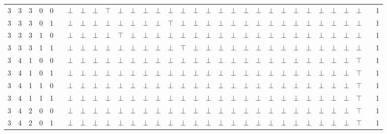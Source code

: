 \documentclass[12pt]{extarticle}
\begin{document}
\begin{landscape}
\begin{tiny}
\begin{longtable}[c]{llllllllllllllllllllllllllllllll}
3 & 3 & 3 & 0 & 0 &  & $\bot$ & $\bot$ & $\bot$ & $\top$ & $\bot$ & $\bot$ & $\bot$ & $\bot$ & $\bot$ & $\bot$ & $\bot$ & $\bot$ & $\bot$ & $\bot$ & $\bot$ & $\bot$ & $\bot$ & $\bot$ & $\bot$ & $\bot$ & $\bot$ & $\bot$ & $\bot$ & $\bot$ &  & 1 \\
3 & 3 & 3 & 0 & 1 &  & $\bot$ & $\bot$ & $\bot$ & $\bot$ & $\bot$ & $\bot$ & $\bot$ & $\bot$ & $\top$ & $\bot$ & $\bot$ & $\bot$ & $\bot$ & $\bot$ & $\bot$ & $\bot$ & $\bot$ & $\bot$ & $\bot$ & $\bot$ & $\bot$ & $\bot$ & $\bot$ & $\bot$ &  & 1 \\
3 & 3 & 3 & 1 & 0 &  & $\bot$ & $\bot$ & $\bot$ & $\bot$ & $\top$ & $\bot$ & $\bot$ & $\bot$ & $\bot$ & $\bot$ & $\bot$ & $\bot$ & $\bot$ & $\bot$ & $\bot$ & $\bot$ & $\bot$ & $\bot$ & $\bot$ & $\bot$ & $\bot$ & $\bot$ & $\bot$ & $\bot$ &  & 1 \\
3 & 3 & 3 & 1 & 1 &  & $\bot$ & $\bot$ & $\bot$ & $\bot$ & $\bot$ & $\bot$ & $\bot$ & $\bot$ & $\bot$ & $\top$ & $\bot$ & $\bot$ & $\bot$ & $\bot$ & $\bot$ & $\bot$ & $\bot$ & $\bot$ & $\bot$ & $\bot$ & $\bot$ & $\bot$ & $\bot$ & $\bot$ &  & 1 \\
3 & 4 & 1 & 0 & 0 &  & $\bot$ & $\bot$ & $\bot$ & $\bot$ & $\bot$ & $\bot$ & $\bot$ & $\bot$ & $\bot$ & $\bot$ & $\bot$ & $\bot$ & $\bot$ & $\bot$ & $\bot$ & $\bot$ & $\bot$ & $\bot$ & $\bot$ & $\bot$ & $\bot$ & $\bot$ & $\bot$ & $\top$ &  & 1 \\
3 & 4 & 1 & 0 & 1 &  & $\bot$ & $\bot$ & $\bot$ & $\bot$ & $\bot$ & $\bot$ & $\bot$ & $\bot$ & $\bot$ & $\bot$ & $\bot$ & $\bot$ & $\bot$ & $\bot$ & $\bot$ & $\bot$ & $\bot$ & $\bot$ & $\bot$ & $\bot$ & $\bot$ & $\bot$ & $\bot$ & $\top$ &  & 1 \\
3 & 4 & 1 & 1 & 0 &  & $\bot$ & $\bot$ & $\bot$ & $\bot$ & $\bot$ & $\bot$ & $\bot$ & $\bot$ & $\bot$ & $\bot$ & $\bot$ & $\bot$ & $\bot$ & $\bot$ & $\bot$ & $\bot$ & $\bot$ & $\bot$ & $\bot$ & $\bot$ & $\bot$ & $\bot$ & $\bot$ & $\top$ &  & 1 \\
3 & 4 & 1 & 1 & 1 &  & $\bot$ & $\bot$ & $\bot$ & $\bot$ & $\bot$ & $\bot$ & $\bot$ & $\bot$ & $\bot$ & $\bot$ & $\bot$ & $\bot$ & $\bot$ & $\bot$ & $\bot$ & $\bot$ & $\bot$ & $\bot$ & $\bot$ & $\bot$ & $\bot$ & $\bot$ & $\bot$ & $\top$ &  & 1 \\
3 & 4 & 2 & 0 & 0 &  & $\bot$ & $\bot$ & $\bot$ & $\bot$ & $\bot$ & $\bot$ & $\bot$ & $\bot$ & $\bot$ & $\bot$ & $\bot$ & $\bot$ & $\bot$ & $\bot$ & $\bot$ & $\bot$ & $\bot$ & $\bot$ & $\bot$ & $\bot$ & $\bot$ & $\bot$ & $\bot$ & $\top$ &  & 1 \\
3 & 4 & 2 & 0 & 1 &  & $\bot$ & $\bot$ & $\bot$ & $\bot$ & $\bot$ & $\bot$ & $\bot$ & $\bot$ & $\bot$ & $\bot$ & $\bot$ & $\bot$ & $\bot$ & $\bot$ & $\bot$ & $\bot$ & $\bot$ & $\bot$ & $\bot$ & $\bot$ & $\bot$ & $\bot$ & $\bot$ & $\top$ &  & 1 \\

\end{longtable}
\end{tiny}
\end{landscape}
\end{document}
